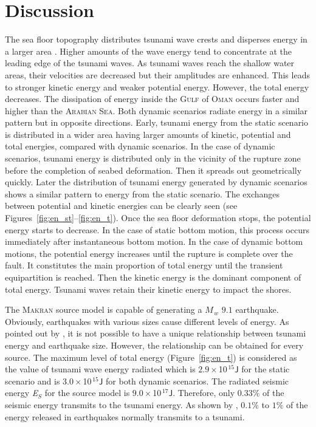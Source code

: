 \documentclass[12pt]{llncs}
\begin{document}
\section{Discussion}

The sea floor topography distributes tsunami wave crests and disperses energy in a larger area \citep{bryant2008tsunami}. Higher amounts of the wave energy tend to concentrate at the leading edge of the tsunami waves. As tsunami waves reach the shallow water areas, their velocities are decreased but their amplitudes are enhanced. This leads to stronger kinetic energy and weaker potential energy. However, the total energy decreases. The dissipation of energy inside the \textsc{Gulf} of \textsc{Oman} occurs faster and higher than the \textsc{Arabian Sea}. Both dynamic scenarios radiate energy in a similar pattern but in opposite directions. Early, tsunami energy from the static scenario is distributed in a wider area having larger amounts of kinetic, potential and total energies, compared with dynamic scenarios. In the case of dynamic scenarios, tsunami energy is distributed only in the vicinity of the rupture zone before the completion of seabed deformation. Then it spreads out geometrically quickly. Later the distribution of tsunami energy generated by dynamic scenarios shows a similar pattern to energy from the static scenario. The exchanges between potential and kinetic energies can be clearly seen (see Figures~\ref{fig:en_st}--\ref{fig:en_t}). Once the sea floor deformation stops, the potential energy starts to decrease. In the case of static bottom motion, this process occurs immediately after instantaneous bottom motion. In the case of dynamic bottom motions, the potential energy increases until the rupture is complete over the fault. It constitutes the main proportion of total energy until the transient equipartition is reached. Then the kinetic energy is the dominant component of total energy. Tsunami waves retain their kinetic energy to impact the shores.

The \textsc{Makran} source model is capable of generating a $M_{\,w}$ $9.1$ earthquake. Obviously, earthquakes with various sizes cause different levels of energy. As pointed out by \cite{Ward80}, it is not possible to have a unique relationship between tsunami energy and earthquake size. However, the relationship can be obtained for every source. The maximum level of total energy (Figure~\ref{fig:en_t}) is considered as the value of tsunami wave energy radiated which is $2.9\times$10$^{\,15} \mathsf{J}$ for the static scenario and is $3.0\times$10$^{\,15} \mathsf{J}$ for both dynamic scenarios. The radiated seismic energy \textit{E}$_S$ \citep{JGRB:JGRB10190} for the source model is $9.0\times$10$^{\,17} \mathsf{J}$. Therefore, only $0.33\%$ of the seismic energy transmits to the tsunami energy. As shown by \cite{Ward80}, $0.1\%$ to $1\%$ of the energy released in earthquakes normally transmits to a tsunami.
\end{document}
